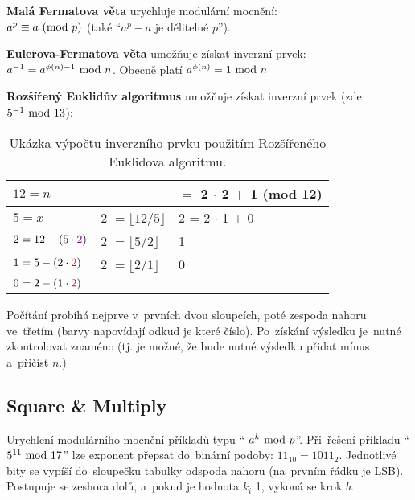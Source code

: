\vspace*{1em} \noindent
\textbf{Malá Fermatova věta} urychluje modulární mocnění: \\
$a^p \equiv a \ (\mathrm{mod}\ p)$ (také \enquote{$a^p - a$ je dělitelné $p$}).

\vspace*{1em} \noindent
\textbf{Eulerova-Fermatova věta} umožňuje získat inverzní prvek: \\
$a^{-1} = a^{\phi(n) - 1} \ \mathrm{mod}\ n$. Obecně platí $a^{\phi(n)} = 1 \ \mathrm{mod}\ n$

\vspace*{1em} \noindent
\textbf{Rozšířený Euklidův algoritmus} umožňuje získat inverzní prvek (zde $5^{-1} \ \mathrm{mod}\ 13$):

\begin{table}[ht]
	\centering
\begin{tabular}{ll|l}
	$12 = n$                               & {}                                           & \boxed{\stackrel{?}{\pm} 5} $=$ {\color{violet}2} $\cdot$ {\color{blue}2} + {\color{brown}1} (mod 12) \\
	\hline
	$5 = x$                                & {\color{violet}2} $= \lfloor 12 / 5 \rfloor$ & {\color{blue}2} = {\color{red}2} $\cdot$ {\color{brown}1} + {\color{teal}0} \\
	$2 = 12 - (5 \cdot {\color{violet}2})$ & {\color{red}2}    $= \lfloor 5 / 2 \rfloor$  & {\color{brown}1} \\
	$1 = 5 - (2 \cdot {\color{red}2})$     & {\color{purple}2} $= \lfloor 2 / 1 \rfloor$  & {\color{teal}0} \\
	$0 = 2 - (1 \cdot {\color{purple}2})$  & {}                                           & {}
\end{tabular}
\caption*{Ukázka výpočtu inverzního prvku použitím Rozšířeného Euklidova algoritmu.}
\end{table}

\noindent
Počítání probíhá nejprve v~prvních dvou sloupcích, poté zespoda nahoru ve~třetím (barvy napovídají odkud je které číslo). Po~získání výsledku je~nutné zkontrolovat znaméno (tj. je možné, že bude nutné výsledku přidat mínus a~přičíst $n$.)

\subsection{Square \& Multiply}

Urychlení modulárního mocnění příkladů typu \enquote{ $a^k \ \mathrm{mod}\ p$}. Při~řešení příkladu \enquote{$5^{11} \ \mathrm{mod}\ 17$} lze exponent přepsat do~binární podoby: $11_{10} = 1011_2$. Jednotlivé bity se vypíší do~sloupečku tabulky odspoda nahoru (na~prvním řádku je LSB). Postupuje se zeshora dolů, a~pokud je hodnota $k_i$ 1, vykoná se krok $b$.


